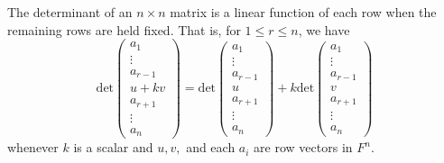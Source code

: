 \begin{theorem}\label{Theorem 4.3}
    The determinant of an \( n \times n  \) matrix is a linear function of each row when the remaining rows are held fixed. That is, for \( 1 \leq r \leq n  \), we have 
    \[  \text{det} \begin{pmatrix} 
               {a}_{1} \\
               \vdots \\ 
               {a}_{r-1} \\
               u + kv \\
               {a}_{r+1} \\
               \vdots \\
               {a}_{n}
              \end{pmatrix} = \text{det}\begin{pmatrix} 
                         {a}_{1} \\
                         \vdots \\
                         {a}_{r-1} \\
                         u \\ 
                         {a}_{r+1} \\
                         \vdots \\
                         {a}_{n}
                        \end{pmatrix}  + k \text{det} \begin{pmatrix} 
                                   {a}_{1} \\
                                   \vdots \\
                                   {a}_{r-1} \\
                                   v \\
                                   {a}_{r+1} \\
                                   \vdots \\
                                   {a}_{n}
                                  \end{pmatrix}   \]
whenever \( k  \) is a scalar and \( u,v, \) and each \( {a}_{i} \) are row vectors in \( F^{n} \).
\end{theorem}
